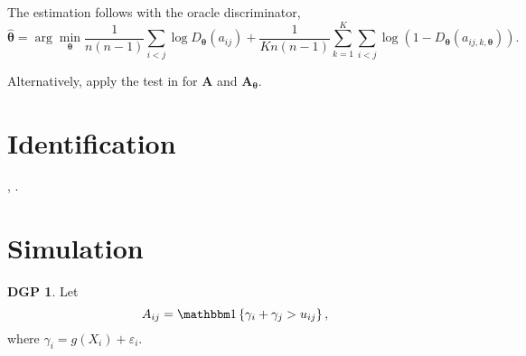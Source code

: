 The estimation follows \citet[KMP]{kaji/manresa/pouliot:2022:adversarial_est} with the oracle discriminator,
\[
    \hat{\bm{\theta }} = \arg\min_{\bm{\theta}} \frac{1}{n \left( n-1 \right) } \sum_{i < j} \log D_{\bm{\theta }} \left( a_{ij}  \right) +  \frac{1}{K n \left( n-1 \right) } \sum_{k=1}^{K} \sum_{i < j} \log  \left( 1 - D_{\bm{\theta}} \left( a_{ij, k, \bm{\theta}} \right)  \right).
\]









\begin{remark}
    Alternatively, apply the test in \citet{auerbach:2022:testdiffnetwork} for \(\bm{A}\) and \(\bm{A}_{\bm{\theta}}\). 
\end{remark}

\section{Identification}

\citet{chatterjee/diaconis/sly:2011:randomgraph}, \citet{gao:2020:identification}.


\section{Simulation}


\noindent \textbf{DGP 1}. Let 
\begin{equation}
    A_{ij} = \I  \left\{  \gamma _{i} + \gamma _{j} > u_{ij}  \right\}, 
\end{equation}
where \(\gamma _{i} = g \left( X_i \right) + \varepsilon _{i} \). 

